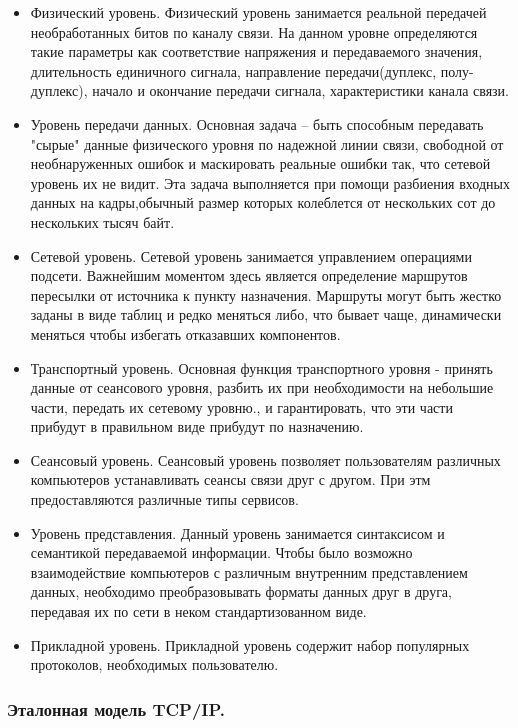 \documentclass[12pt]{report}
\begin{document}
    \begin{itemize}
        \item Физический уровень. Физический уровень занимается реальной передачей необработанных битов по каналу связи. На данном уровне определяются такие параметры как соответствие напряжения и передаваемого значения, длительность единичного сигнала, направление передачи(дуплекс, полу-дуплекс), начало и окончание передачи сигнала, характеристики канала связи.
        \item Уровень передачи данных. Основная задача -- быть способным передавать "сырые" данные физического уровня по надежной линии связи, свободной от необнаруженных ошибок и маскировать реальные ошибки так, что сетевой уровень их не видит. Эта задача выполняется при помощи разбиения входных данных на кадры,обычный размер которых колеблется от нескольких сот до нескольких тысяч байт.
        \item Сетевой уровень. Сетевой уровень занимается управлением операциями подсети. Важнейшим моментом здесь является определение маршрутов пересылки от источника к пункту назначения. Маршруты могут быть жестко заданы в виде таблиц и редко меняться либо, что бывает чаще, динамически меняться чтобы избегать отказавших компонентов.
        \item Транспортный уровень. Основная функция транспортного уровня - принять данные от сеансового уровня, разбить их при необходимости на небольшие части, передать их сетевому уровню., и гарантировать, что эти части прибудут в правильном виде прибудут по назначению.
        \item Сеансовый уровень. Сеансовый уровень позволяет пользователям различных компьютеров устанавливать сеансы связи друг с другом. При этм предоставляются различные типы сервисов.
        \item Уровень представления. Данный уровень занимается синтаксисом и семантикой передаваемой информации. Чтобы было возможно взаимодействие компьютеров с различным внутренним представлением данных, необходимо преобразовывать форматы данных друг в друга, передавая их по сети в неком стандартизованном виде.
        \item Прикладной уровень. Прикладной уровень содержит набор популярных протоколов, необходимых пользователю.
    \end{itemize}

\subsubsection{Эталонная модель TCP/IP. }
\end{document}

